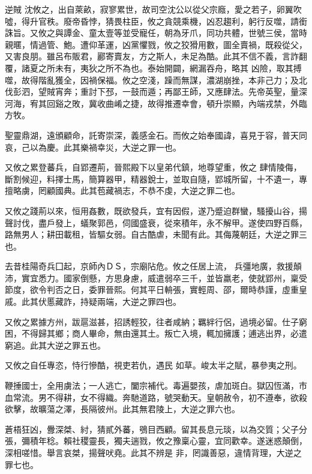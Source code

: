 \begin{pinyinscope}
 逆賊
 沈攸之，出自萊畝，寂寥累世，故司空沈公以從父宗廕，愛之若子，卵翼吹噓，得升官秩。廢帝昏悖，猜畏柱臣，攸之貪競乘機，凶忍趨利，躬行反噬，請銜誅旨。又攸之與譚金、童太壹等並受寵任，朝為牙爪，同功共體，世號三侯，當時親暱，情過管、鮑。遭仰革運，凶黨懼戮，攸之狡猾用數，圖全賣禍，既殺從父，又害良朋。雖呂布販君，酈寄賣友，方之斯人，未足為酷。此其不信不義，言詐翻覆，諸夏之所未有，夷狄之所不為也。泰始開闢，網漏吞舟，略其
 凶險，取其搏噬，故得階亂獲全，因禍保福。攸之空淺，躁而無謀，濃湖崩挫，本非己力；及北伐彭泗，望賊宵奔；重討下邳，一鼓而遁；再鄙王師，又應肆法。先帝英聖，量深河海，宥其回谿之敗，冀收曲崤之捷，故得推遷幸會，頓升崇顯，內端戎禁，外臨方牧。



 聖靈鼎湖，遠頒顧命，託寄崇深，義感金石。而攸之始奉國諱，喜見于容，普天同哀，己以為慶。此其樂禍幸災，大逆之罪一也。



 又攸之累登蕃兵，自郢遷荊，晉熙殿下以皇弟代鎮，地尊望重，攸之
 肆情陵侮，斷割候迎，料擇士馬，簡算器甲，精器銳士，並取自隨，郢城所留，十不遺一，專擅略虜，罔顧國典。此其苞藏禍志，不恭不虔，大逆之罪二也。



 又攸之踐荊以來，恒用姦數，既欲發兵，宜有因假，遂乃蹙迫群蠻，騷擾山谷，揚聲討伐，盡戶發上，蟻聚郭邑，伺國盛衰，從來積年，永不解甲。遂使四野百縣，路無男人；耕田載租，皆驅女弱。自古酷虐，未聞有此。其侮蔑朝廷，大逆之罪三也。



 去昔桂陽奇兵囗起，京師內ＤＳ，宗廟阽危。攸之任居上流，
 兵彊地廣，救援顛沛，實宜悉力。國家倒懸，方思身慮，威遣弱卒三千，並皆羸老，使就郢州，稟受節度，欲令判否之日，委罪晉熙。何其平日輈張，實輕周、邵，爾時恭謹，虛重皇戚。此其伏慝藏詐，持疑兩端，大逆之罪四也。



 又攸之累據方州，跋扈滋甚，招誘輕狡，往者咸納；羈絆行侶，過境必留。仕子窮困，不得歸其鄉；商人畢命，無由還其土。叛亡入境，輒加擁護；逋逃出界，必遣窮追。此其大逆之罪五也。



 又攸之自任專恣，恃行慘酷，視吏若仇，遇民
 如草。峻太半之賦，暴參夷之刑。



 鞭捶國士，全用虜法；一人逃亡，闔宗補代。毒遍嬰孩，虐加斑白。獄囚恆滿，市血常流。男不得耕，女不得織。奔馳道路，號哭動天。皇朝赦令，初不遵奉，欲殺欲擊，故曠蕩之澤，長隔彼州。此其無君陵上，大逆之罪六也。



 蒼梧狂凶，釁深桀、紂，猜貳外蕃，鴞目西顧。留其長息元琰，以為交質；父子分張，彌積年稔。賴社稷靈長，獨夫遄戮，攸之豫稟心靈，宜同歡幸。遂迷惑顛倒，深相嗟惜。舉言哀桀，揚聲吠堯。此其不辨是
 非，罔識善惡，違情背理，大逆之罪七也。




\end{pinyinscope}
